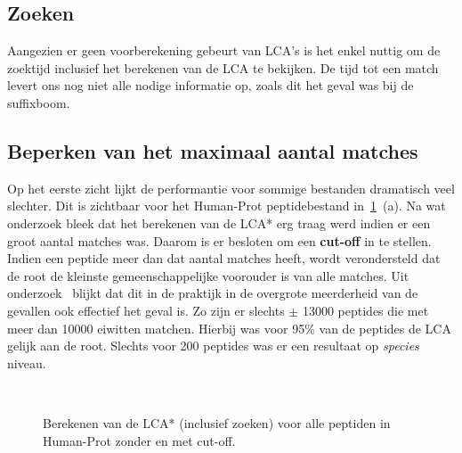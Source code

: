 \subsection{Zoeken}
Aangezien er geen voorberekening gebeurt van LCA's is het enkel nuttig om de zoektijd inclusief het berekenen van de LCA te bekijken.
De tijd tot een match levert ons nog niet alle nodige informatie op, zoals dit het geval was bij de suffixboom.

\subsection{Beperken van het maximaal aantal matches}\label{subsec:maximaal-aantal-matches}
Op het eerste zicht lijkt de performantie voor sommige bestanden dramatisch veel slechter.
Dit is zichtbaar voor het Human-Prot peptidebestand in~\ref{fig:cutoff_humanprot}~(a).
Na wat onderzoek bleek dat het berekenen van de LCA* erg traag werd indien er een groot aantal matches was.
Daarom is er besloten om een \textbf{cut-off} in te stellen.
Indien een peptide meer dan dat aantal matches heeft, wordt verondersteld dat de root de kleinste gemeenschappelijke voorouder is van alle matches.
Uit onderzoek~\cite{unipept_cutoff} blijkt dat dit in de praktijk in de overgrote meerderheid van de gevallen ook effectief het geval is.
Zo zijn er slechts $\pm$ 13000 peptides die met meer dan 10000 eiwitten matchen.
Hierbij was voor 95\% van de peptides de LCA gelijk aan de root.
Slechts voor 200 peptides was er een resultaat op \textit{species} niveau.
\\
\begin{figure}[H]
    \centering
    \\[4ex] %

    \caption{Berekenen van de LCA* (inclusief zoeken) voor alle peptiden in Human-Prot zonder en met cut-off.}\label{fig:cutoff_humanprot}
\end{figure}

